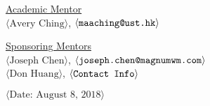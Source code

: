 \begin{center}
\vspace \shiftdownb
\underline {Academic Mentor} \\
\vspace{5pt}
$\langle \text{Avery Ching}\rangle$, $\langle \text{\texttt{maaching@ust.hk}} \rangle$

\vspace \shiftdownb
\underline {Sponsoring Mentors}\\
\vspace{5pt}
$\langle \text{Joseph Chen}\rangle$, $\langle \text{\texttt{joseph.chen@magnumwm.com}} \rangle$\\
$\langle \text{Don Huang}\rangle$, $\langle \text{\texttt{Contact Info}} \rangle$
\vspace{3pt}



\vspace \shiftdowna
$\langle \text{Date: August 8, 2018}\rangle$ 

\end{center}


